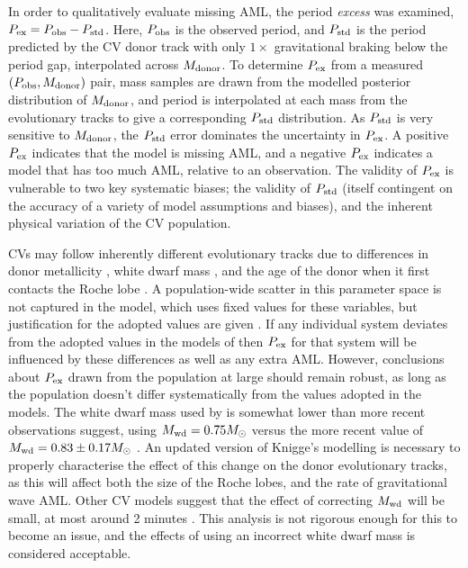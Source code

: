 In order to qualitatively evaluate missing AML, the period \textit{excess} was examined, $P_{\rm ex} = P_{\rm obs} - P_{\rm std}$. Here, $P_{\rm obs}$ is the observed period, and $P_{\rm std}$ is the period predicted by the \citet{knigge11} CV donor track with only $1\times$ gravitational braking below the period gap, interpolated across $M_{\rm donor}$.
To determine $P_{\rm ex}$ from a measured $(P_{\rm obs}, M_{\rm donor})$ pair, mass samples are drawn from the modelled posterior distribution of $M_{\rm donor}$, and period is interpolated at each mass from the evolutionary tracks to give a corresponding $P_{\rm std}$ distribution. As $P_{\rm std}$ is very sensitive to $M_{\rm donor}$, the $P_{\rm std}$ error dominates the uncertainty in $P_{\rm ex}$.
A positive $P_{\rm ex}$ indicates that the model is missing AML, and a negative $P_{\rm ex}$ indicates a model that has too much AML, relative to an observation.
The validity of $P_{\rm ex}$ is vulnerable to two key systematic biases; the validity of $P_{\rm std}$ (itself contingent on the accuracy of a variety of model assumptions and biases), and the inherent physical variation of the CV population.

CVs may follow inherently different evolutionary tracks due to differences in donor metallicity \citep{stehle1997, harrison2016}, white dwarf mass \citep{knigge2006}, and the age of the donor when it first contacts the Roche lobe \citep{howell2001}. A population-wide scatter in this parameter space is not captured in the \citet{knigge11} model, which uses fixed values for these variables, but justification for the adopted values are given \citep{knigge11, knigge2006}.
If any individual system deviates from the adopted values in the models of \citet{knigge11} then $P_{\rm ex}$ for that system will be influenced by these differences as well as any extra AML. However, conclusions about $P_{\rm ex}$ drawn from the population at large should remain robust, as long as the population doesn't differ systematically from the values adopted in the models.
The white dwarf mass used by \citet{knigge11} is somewhat lower than more recent observations suggest, using $M_{\rm wd} = 0.75 M_\odot$ versus the more recent value of $M_{\rm wd} = 0.83 \pm 0.17 M_\odot$ \citep{pala2020}.
An updated version of Knigge's modelling is necessary to properly characterise the effect of this change on the donor evolutionary tracks, as this will affect both the size of the Roche lobes, and the rate of gravitational wave AML.
Other CV models suggest that the effect of correcting $M_{\rm wd}$ will be small, at most around 2 minutes \citep{goliasch2015}. This analysis is not rigorous enough for this to become an issue, and the effects of using an incorrect white dwarf mass is considered acceptable.

